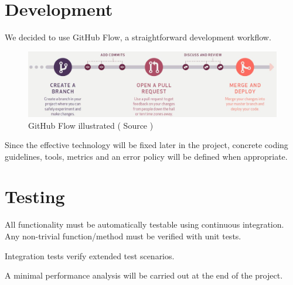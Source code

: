 \section{Development}

We decided to use GitHub Flow\cite{github-flow}, a straightforward development workflow.

\begin{figure}[H]
    \centering
    \includegraphics[width=0.85\linewidth]{resources/github_flow}
    \caption[Organigram]{GitHub Flow illustrated ( Source \cite{github-flow})}
    \label{fig:organigram}
\end{figure}


Since the effective technology will be fixed later in the project, concrete coding guidelines, tools, metrics and an error policy will be defined when appropriate.


\section{Testing}
All functionality must be automatically testable using continuous integration. Any non-trivial function/method must be verified with unit tests.

Integration tests verify extended test scenarios.

A minimal performance analysis will be carried out at the end of the project.



\label{lastpage} %

\backmatter
{}






